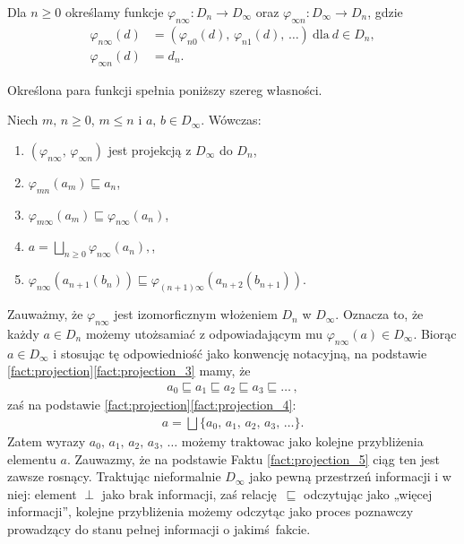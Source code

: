 \begin{definicja}[\(D_\infty\)]%
Dla \(n\geq 0\) określamy funkcje \(\varphi_{n\infty}:D_n\to D_\infty\) oraz \(\varphi_{\infty n}: D_\infty \to D_n\), gdzie 
\begin{align*}
\varphi_{n\infty}(d) &= (\varphi_{n0}(d),\,\varphi_{n1}(d),\,\dots)\ \text{dla}\ d\in D_n,\\
\varphi_{\infty n}(d) &= d_n.
\end{align*}
\end{definicja}

Określona para funkcji spełnia poniższy szereg własności.

\begin{fakt}\label{fact:projection}%
Niech \(m,\,n\geq 0\), \(m\leq n\) i \(a,\,b\in D_\infty\). Wówczas:
\begin{enumerate}[label={(\roman*)}, ref={(\roman*)}] 
  \setlength\itemsep{0em}
  \item \((\varphi_{n\infty},\,\varphi_{\infty n})\) jest projekcją z \(D_\infty\) do \(D_n\),\label{fact:projection_1}
\item \(\varphi_{mn}(a_m)\sqsubseteq a_n\),\label{fact:projection_2}
\item \(\varphi_{m\infty}(a_m)\sqsubseteq \varphi_{n\infty}(a_n)\),\label{fact:projection_3}
\item \(a=\bigsqcup_{n\geq 0}\varphi_{n\infty}(a_n),\),\label{fact:projection_4}
\item \(\varphi_{n\infty}(a_{n+1}(b_n))\sqsubseteq\varphi_{(n+1)\infty}(a_{n+2}(b_{n+1}))\).\label{fact:projection_5}
\end{enumerate}
\end{fakt}

Zauważmy, że \(\varphi_{n\infty}\) jest izomorficznym włożeniem \(D_n\) w \(D_\infty\). Oznacza to, że każdy \(a\in D_n\) możemy utożsamiać z odpowiadającym mu \(\varphi_{n\infty}(a)\in D_\infty\). Biorąc \(a\in D_\infty\) i stosując tę odpowiedniość jako konwencję notacyjną, na podstawie \ref{fact:projection}\ref{fact:projection_3} mamy, że
\begin{align*}
 a_0 \sqsubseteq  a_1 \sqsubseteq a_2 \sqsubseteq a_3 \sqsubseteq \dots\,,
\end{align*}
zaś na podstawie \ref{fact:projection}\ref{fact:projection_4}:
\begin{align*}
  a=\bigsqcup\{a_0,\,a_1,\,a_2,\,a_3,\,\dots\}.
\end{align*}
Zatem wyrazy \(a_0,\,a_1,\,a_2,\,a_3,\,\dots\) możemy traktowac jako kolejne przybliżenia elementu \(a\). Zauwazmy, że na podstawie Faktu \ref{fact:projection_5} ciąg ten jest zawsze rosnący. Traktując nieformalnie \(D_\infty\) jako pewną przestrzeń informacji i w niej: element \(\perp\) jako brak informacji, zaś relację \(\sqsubseteq\) odczytując jako „więcej informacji”, kolejne przybliżenia możemy odczytąc jako proces poznawczy prowadzący do stanu pełnej informacji o jakimś fakcie.  

